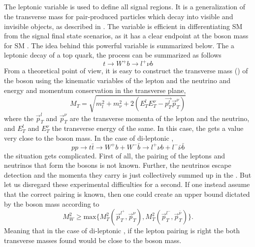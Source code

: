 \subsection{\mttwo}\label{sec:MT2}
The leptonic \mttwo variable is used to define all signal regions. 
It is a generalization of the transverse mass for pair-produced particles which decay into visible and invisible objects, as described in \cite{Lester:1999tx,Barr_2003}. 
The variable is efficient in differentiating SM \ttbar from the signal final state scenarios, as it has a clear endpoint at the \PW boson mass for SM \ttbar. 
The idea behind this powerful variable is summarized below. 
The a leptonic decay of a top quark, the process can be summarized as follows
\begin{equation}
t\rightarrow W^{+}b \rightarrow l^{+}\nu b 
\end{equation}
From a theoretical point of view, it is easy to construct the transverse mass (\mT) of the \PW boson using the kinematic variables of the lepton and the neutrino and energy and momentum conservation in the transverse plane,
\begin{equation}
M_{T}=\sqrt{m_{l}^{2}+m_{\nu}^{2}+2(E_{T}^{l}E_{T}^{\nu}-\vec{p_{T}^{l}}\vec{p}_{T}^{\nu})}
\end{equation} 
where the $\vec{p}_{T}^{l}$ and $\vec{p}_{T}^{\nu}$ are the transverse momenta of the lepton and the neutrino, and $E_{T}^{l}$ and $E_{T}^{\nu}$ the transverse energy of the same.
In this case, the \mT gets a value very close to the \PW boson mass. 
In the case of di-leptonic \ttbar, 
\begin{equation}
pp\rightarrow t\bar{t}\rightarrow W^{+}b + W^{-}\bar{b}\rightarrow l^{+}\nu b +l^{-}\bar{\nu}\bar{b}
\end{equation}
the situation gets complicated. 
First of all, the pairing of the leptons and neutrinos that form the \PW bosons is not known. 
Further, the neutrinos escape detection and the momenta they carry is just collectively summed up in the \ptmiss. 
But let us disregard these experimental difficulties for a second. 
If one instead assume that the correct pairing is known, then one could create an upper bound dictated by the \PW boson mass according to
\begin{equation}
M_{W}^{2}\geq \mathrm{max}\{M_{T}^{2}\left(\vec{p}_{T}^{l^{+}},\vec{p}_{T}^{\nu}\right), M_{T}^{2}\left(\vec{p}_{T}^{l^{-}},\vec{p}_{T}^{\bar{\nu}}\right)\}.
\end{equation}
Meaning that in the case of di-leptonic \ttbar, if the lepton pairing is right the both transverse masses found would be close to the \PW boson mass. 
